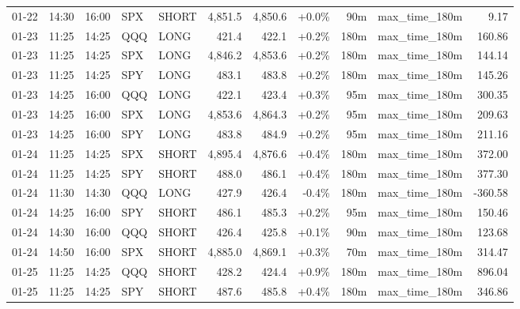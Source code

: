 \documentclass[11pt,a4paper,twoside]{article}
\begin{document}
\begin{center}
\begin{longtable}{>{\color{txtmain}}l l l l l r r r r >{\color{txtmain}}l r}
01-22 & 14:30 & 16:00 & SPX & SHORT & 4,851.5 & 4,850.6 & \textcolor{wingreen}{+0.0\%} & 90m & max\_time\_180m & \textcolor{wingreen}{9.17} \\
01-23 & 11:25 & 14:25 & QQQ & LONG & 421.4 & 422.1 & \textcolor{wingreen}{+0.2\%} & 180m & max\_time\_180m & \textcolor{wingreen}{160.86} \\
01-23 & 11:25 & 14:25 & SPX & LONG & 4,846.2 & 4,853.6 & \textcolor{wingreen}{+0.2\%} & 180m & max\_time\_180m & \textcolor{wingreen}{144.14} \\
01-23 & 11:25 & 14:25 & SPY & LONG & 483.1 & 483.8 & \textcolor{wingreen}{+0.2\%} & 180m & max\_time\_180m & \textcolor{wingreen}{145.26} \\
01-23 & 14:25 & 16:00 & QQQ & LONG & 422.1 & 423.4 & \textcolor{wingreen}{+0.3\%} & 95m & max\_time\_180m & \textcolor{wingreen}{300.35} \\
01-23 & 14:25 & 16:00 & SPX & LONG & 4,853.6 & 4,864.3 & \textcolor{wingreen}{+0.2\%} & 95m & max\_time\_180m & \textcolor{wingreen}{209.63} \\
01-23 & 14:25 & 16:00 & SPY & LONG & 483.8 & 484.9 & \textcolor{wingreen}{+0.2\%} & 95m & max\_time\_180m & \textcolor{wingreen}{211.16} \\
01-24 & 11:25 & 14:25 & SPX & SHORT & 4,895.4 & 4,876.6 & \textcolor{wingreen}{+0.4\%} & 180m & max\_time\_180m & \textcolor{wingreen}{372.00} \\
01-24 & 11:25 & 14:25 & SPY & SHORT & 488.0 & 486.1 & \textcolor{wingreen}{+0.4\%} & 180m & max\_time\_180m & \textcolor{wingreen}{377.30} \\
01-24 & 11:30 & 14:30 & QQQ & LONG & 427.9 & 426.4 & \textcolor{lossred}{-0.4\%} & 180m & max\_time\_180m & \textcolor{lossred}{-360.58} \\
01-24 & 14:25 & 16:00 & SPY & SHORT & 486.1 & 485.3 & \textcolor{wingreen}{+0.2\%} & 95m & max\_time\_180m & \textcolor{wingreen}{150.46} \\
01-24 & 14:30 & 16:00 & QQQ & SHORT & 426.4 & 425.8 & \textcolor{wingreen}{+0.1\%} & 90m & max\_time\_180m & \textcolor{wingreen}{123.68} \\
01-24 & 14:50 & 16:00 & SPX & SHORT & 4,885.0 & 4,869.1 & \textcolor{wingreen}{+0.3\%} & 70m & max\_time\_180m & \textcolor{wingreen}{314.47} \\
01-25 & 11:25 & 14:25 & QQQ & SHORT & 428.2 & 424.4 & \textcolor{wingreen}{+0.9\%} & 180m & max\_time\_180m & \textcolor{wingreen}{896.04} \\
01-25 & 11:25 & 14:25 & SPY & SHORT & 487.6 & 485.8 & \textcolor{wingreen}{+0.4\%} & 180m & max\_time\_180m & \textcolor{wingreen}{346.86} \\

\end{longtable}
\end{center}
\end{document}
